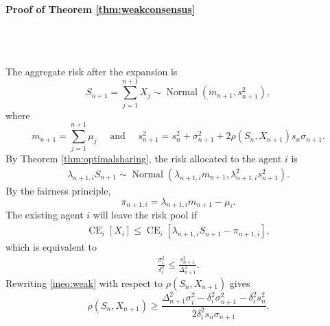\documentclass[fleqn,mnsc,nonblindrev]{informs4}
\newcommand{\Normal}{\operatorname{Normal}}
\newcommand{\CE}{\operatorname{CE}}
\begin{document}
\paragraph{Proof of Theorem \ref{thm:weakconsensus}}
\\ \


The aggregate risk after the expansion is 
\[
S_{n+1}=\sum_{j=1}^{n+1}X_j\sim\Normal(m_{n+1},s_{n+1}^2),
\]
where
\[
m_{n+1}=\sum_{j=1}^{n+1}\mu_j\quad\text{ and }\quad s_{n+1}^2=s_n^2+\sigma_{n+1}^2+2\rho(S_n,X_{n+1})s_n\sigma_{n+1}.
\]
By Theorem \ref{thm:optimalsharing}, the risk allocated to the agent $i$ is
\begin{align*}
\lambda_{n+1,i}S_{n+1}\sim\Normal\left(\lambda_{n+1,i}m_{n+1},\lambda_{n+1,i}^2s_{n+1}^2\right).
\end{align*}
By the fairness principle,
\[
\pi_{n+1,i}=\lambda_{n+1,i}m_{n+1}-\mu_i.
\]
The existing agent $i$ will leave the risk pool if 
\begin{align*}
\CE_{i}[X_{i}]\leq\CE_{i}[\lambda_{n+1,i}S_{n+1}-\pi_{n+1,i}],
\end{align*}
which is equivalent to
\begin{gather}
\frac{\sigma_{i}^2}{\delta_i^2}
\leq \frac{s_{n+1}^2}{\Delta_{n+1}^2}.\label{ineq:weak}
\end{gather}
Rewriting \eqref{ineq:weak} with respect to $\rho(S_n,X_{n+1})$ gives
\[
\rho(S_n,X_{n+1})\geq\frac{\Delta_{n+1}^2\sigma_i^2-\delta_i^2\sigma_{n+1}^2-\delta_i^2s_{n}^2}{2\delta_i^2s_n\sigma_{n+1}}.
\]




\end{document}
